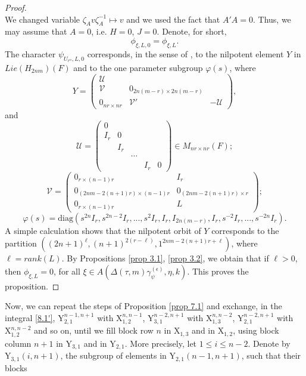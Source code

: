 \documentclass[12pts]{amsart}
\newcommand{\diag}{{\mathrm{diag}}}
\newcommand{\I}{{\mathrm{I}}}
\begin{document}
\begin{proof}
$$	$$
	We changed variable $\zeta_A v \zeta_A^{-1}\mapsto v$ and we used
	the fact that $A'A=0$. Thus, we may assume that $A=0$, i.e. $H=0$,
	$J=0$. Denote, for short,
	$$
	\phi_{\xi,L,0}=\phi_{\xi,L}.
	$$
	The character $\psi_{U_{r^n},L,0}$ corresponds, in the sense of
	\cite{MW87}, to the nilpotent element $Y$ in $Lie(H_{2nm})(F)$
	and to the one parameter subgroup $\varphi(s)$, where
	\begin{equation}\label{8.13}
	Y=\begin{pmatrix}\mathcal{U}\\
	\mathcal{V}&0_{2n(m-r)\times 2n(m-r)}\\0_{nr\times
		nr}&\mathcal{V}'&-\mathcal{U}\end{pmatrix},
	\end{equation}
	and
	$$
	\mathcal{U}=\begin{pmatrix}0\\I_r&0\\&I_r\\
	&&\cdots\\&&&I_r&0\end{pmatrix}\in M_{nr\times nr}(F);
	$$
	$$
	\mathcal{V}=\begin{pmatrix}0_{r\times
		(n-1)r}&I_r\\0_{(2nm-2(n+1)r)\times(n-1)r}&0_{(2nm-2(n+1)r)\times
		r}\\0_{r\times (n-1)r}&L\end{pmatrix};
	$$
	$$
	\varphi(s)=\diag(s^{2n}I_r,s^{2n-2}I_r,...,s^2I_r, I_r,
	I_{2n(m-r)},I_r,s^{-2}I_r,...,s^{-2n}I_r).
	$$
	A simple calculation shows that the nilpotent orbit of $Y$
	corresponds to the partition $((2n+1)^\ell,
	(n+1)^{2(r-\ell)},1^{2nm-2(n+1)r+\ell})$, where $\ell=rank(L)$.
	By Propositions \ref{prop 3.1}, \ref{prop 3.2}, we obtain that if $\ell>0$, then
	$\phi_{\xi,L}=0$, for all $\xi\in A(\Delta(\tau,m)\gamma_\psi^{(\epsilon)},\eta,k)$. This proves the proposition.
\end{proof}
Now, we can repeat the steps of Proposition \ref{prop 7.1} and
exchange, in the integral \eqref{8.1'}, $\mathrm{Y}_{2,1}^{n-1,n+1}$
with $\mathrm{X}_{1,2}^{n,n-1}$, $\mathrm{Y}_{3,1}^{n-2,n+1}$ with
$\mathrm{X}_{1,3}^{n,n-2}$, $\mathrm{Y}_{2,1}^{n-2,n+1}$ with
$\mathrm{X}_{1,2}^{n,n-2}$ and so on, until we fill block row $n$ in
$\mathrm{X}_{1,3}$ and in $\mathrm{X}_{1,2}$, using block column
$n+1$ in $\mathrm{Y}_{3,1}$ and in $\mathrm{Y}_{2,1}$. More
precisely, let $1\leq i\leq n-2$. Denote by
$\mathrm{Y}_{3,1}(i,n+1)$, the subgroup of elements in
$\mathrm{Y}_{2,1}(n-1,n+1)$, such that their blocks
\end{document}
